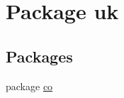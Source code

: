 \hypertarget{namespaceuk}{}\section{Package uk}
\label{namespaceuk}
\subsection*{Packages}
\begin{DoxyCompactItemize}
\item 
package \hyperlink{namespaceuk_1_1co}{co}
\end{DoxyCompactItemize}
